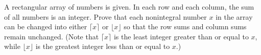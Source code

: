 A rectangular array of numbers is given. In each row and each column, the sum of all numbers is an integer. Prove that each nonintegral number $x$ in the array can be changed into either $\lceil x \rceil$ or $\lfloor x \rfloor$ so that the row sums and column sums remain unchanged. (Note that $\lceil x \rceil$ is the least integer greater than or equal to $x$, while $\lfloor x \rfloor$ is the greatest integer less than or equal to $x$.)
